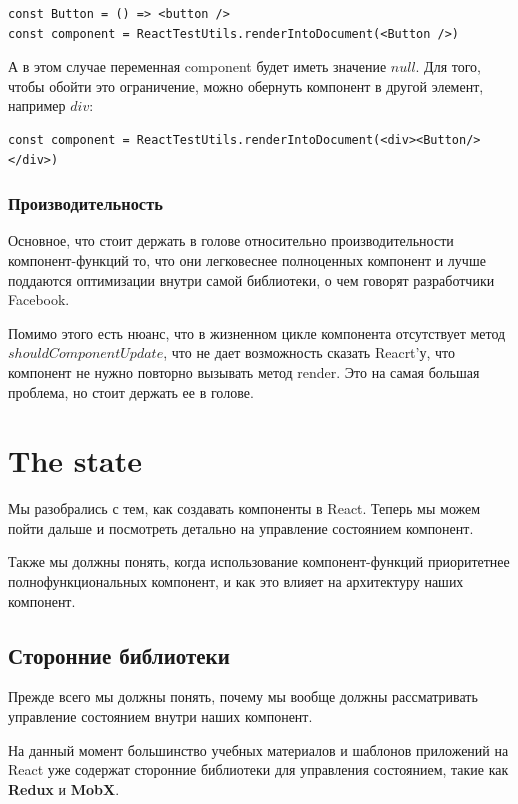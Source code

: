 \begin{lstlisting}
const Button = () => <button />
const component = ReactTestUtils.renderIntoDocument(<Button />)
\end{lstlisting}

А в этом случае переменная component будет иметь значение $null$. Для того, чтобы обойти это ограничение, можно обернуть компонент в другой элемент, например $div$:

\begin{lstlisting}
const component = ReactTestUtils.renderIntoDocument(<div><Button/></div>)
\end{lstlisting}

\subsubsection{Производительность}

Основное, что стоит держать в голове относительно производительности компонент-функций то, что они легковеснее полноценных компонент и лучше поддаются оптимизации внутри самой библиотеки, о чем говорят разработчики Facebook. 

Помимо этого есть нюанс, что в жизненном цикле компонента отсутствует метод $shouldComponentUpdate$, что не дает возможность сказать Reacrt'у, что компонент не нужно повторно вызывать метод render. Это на самая большая проблема, но стоит держать ее в голове.


\section{The state}

Мы разобрались с тем, как создавать компоненты в React.
Теперь мы можем пойти дальше и посмотреть детально на управление состоянием компонент.

Также мы должны понять, когда использование компонент-функций приоритетнее полнофункциональных компонент, и как это влияет на архитектуру наших компонент. 

\subsection{Сторонние библиотеки}

Прежде всего мы должны понять, почему мы вообще должны рассматривать управление состоянием внутри наших компонент. 

На данный момент большинство учебных материалов и шаблонов приложений на React уже содержат сторонние библиотеки для управления состоянием, такие как \textbf{Redux} и \textbf{MobX}.

